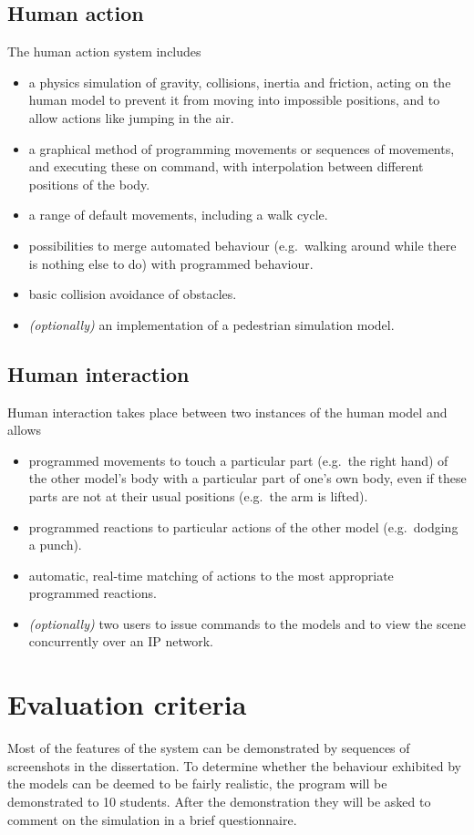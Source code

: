 \documentclass{article}
\begin{document}
\subsection{Human action}
The human action system includes
\begin{itemize}
  \item a physics simulation of gravity, collisions, inertia and friction,
  	    acting on the human model to prevent it from moving into
        impossible positions, and to allow actions like jumping in the air.
  \item a graphical method of programming movements or sequences of movements,
  		  and executing these on command, with interpolation between different
  		  positions of the body.
  \item a range of default movements, including a walk cycle.
  \item possibilities to merge automated behaviour (e.g.\ walking around while
        there is nothing else to do) with programmed behaviour.
  \item basic collision avoidance of obstacles.
  \item {\em (optionally)\/} an implementation of a pedestrian simulation model.
\end{itemize}

\subsection{Human interaction}
Human interaction takes place between two instances of the human model and
allows
\begin{itemize}
  \item programmed movements to touch a particular part (e.g.\ the right hand)
        of the other model's body with a particular part of one's own body,
        even if these parts are not at their usual positions (e.g.\ the arm is
        lifted).
  \item programmed reactions to particular actions of the other model (e.g.\
        dodging a punch).
  \item automatic, real-time matching of actions to the most appropriate
        programmed reactions.
  \item {\em (optionally)\/} two users to issue commands to the models and to
        view the scene concurrently over an IP network.
\end{itemize}


\section{Evaluation criteria}
Most of the features of the system can be demonstrated by sequences of
screenshots in the dissertation. To determine whether the behaviour exhibited
by the models can be deemed to be fairly realistic, the program will be
demonstrated to 10 students. After the demonstration they will be asked to
comment on the simulation in a brief questionnaire.
\end{document}
